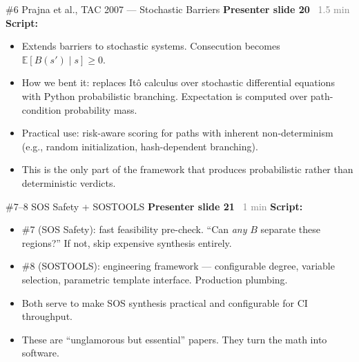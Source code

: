 \documentclass[aspectratio=169]{beamer}
\newcommand{\syncline}[2]{\textbf{#1} \hfill \textcolor{gray}{#2}}
\begin{document}
\begin{frame}{\#6 Prajna et al., TAC 2007 --- Stochastic Barriers}
\syncline{Presenter slide 20}{~1.5 min}
\textbf{Script:}
\begin{itemize}
  \item Extends barriers to stochastic systems. Consecution becomes $\mathbb{E}[B(s') \mid s] \ge 0$.
  \item How we bent it: replaces It\^{o} calculus over stochastic differential equations with Python probabilistic branching. Expectation is computed over path-condition probability mass.
  \item Practical use: risk-aware scoring for paths with inherent non-determinism (e.g., random initialization, hash-dependent branching).
  \item This is the only part of the framework that produces probabilistic rather than deterministic verdicts.
\end{itemize}
\end{frame}

\begin{frame}{\#7--8 SOS Safety + SOSTOOLS}
\syncline{Presenter slide 21}{~1 min}
\textbf{Script:}
\begin{itemize}
  \item \#7 (SOS Safety): fast feasibility pre-check. ``Can \emph{any} $B$ separate these regions?'' If not, skip expensive synthesis entirely.
  \item \#8 (SOSTOOLS): engineering framework --- configurable degree, variable selection, parametric template interface. Production plumbing.
  \item Both serve to make SOS synthesis practical and configurable for CI throughput.
  \item These are ``unglamorous but essential'' papers. They turn the math into software.
\end{itemize}
\end{frame}

\end{document}
